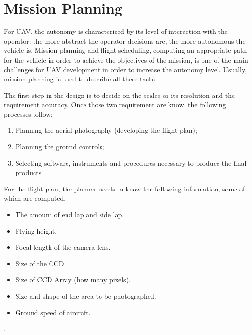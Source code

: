 \section{Mission Planning}
For UAV, the autonomy is characterized by its level of
interaction with the operator: the more abstract the operator decisions are, the more autonomous the vehicle is. Mission planning and flight scheduling, computing an appropriate path for the vehicle in order to achieve the objectives of the mission, is one of the main challenges for UAV development in order to increase the autonomy level. Usually, mission planning is used to describe all these tasks\cite{4281723}

The first step in the design is to decide on the scales or its resolution and the requirement accuracy. Once those two requirement are know, the following processes follow:
\begin{enumerate}
\item Planning the aerial photography (developing the flight plan);
\item Planning the ground controls;
\item Selecting software, instruments and procedures necessary to produce the final products
\end{enumerate}
For the flight plan, the planner needs to know the following information, some of which are computed.\cite{Design_plann}
\begin{itemize}
\item The amount of end lap and side lap.
\item Flying height.
\item Focal length of the camera lens.
\item Size of the CCD.
\item Size of CCD Array (how many pixels).
\item Size and shape of the area to be photographed.
\item Ground speed of aircraft.
\end{itemize}.

